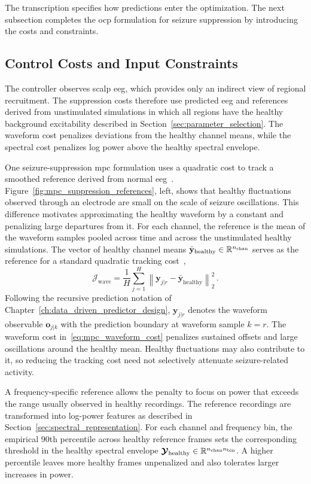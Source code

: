 The transcription specifies how predictions enter the optimization.
The next subsection completes the \ac{ocp} formulation for seizure suppression by introducing the costs and constraints.

\subsection{Control Costs and Input Constraints}\label{sec:mpc_cost_functions}

The controller observes scalp \ac{eeg}, which provides only an indirect view of regional recruitment.
The suppression costs therefore use predicted \ac{eeg} and references derived from unstimulated simulations in which all regions have the healthy background excitability described in Section~\ref{sec:parameter_selection}.
The waveform cost penalizes deviations from the healthy channel means, while the spectral cost penalizes log power above the healthy spectral envelope.

One seizure-suppression \ac{mpc} formulation uses a quadratic cost to track a smoothed reference derived from normal \ac{eeg}~\cite{Chang2020}.
Figure~\ref{fig:mpc_suppression_references}, left, shows that healthy fluctuations observed through an electrode are small on the scale of seizure oscillations.
This difference motivates approximating the healthy waveform by a constant and penalizing large departures from it.
For each channel, the reference is the mean of the waveform samples pooled across time and across the unstimulated healthy simulations.
The vector of healthy channel means $\bar{\mathbf y}_{\mathrm{healthy}}\in\mathbb R^{n_{\mathrm{chan}}}$ serves as the reference for a standard quadratic tracking cost~\cite{Rawlings2017},
%
\begin{equation}
    \mathcal J_{\mathrm{wave}}
    =\frac{1}{H}\sum_{j=1}^{H}
      \left\|\mathbf y_{j|r}-\bar{\mathbf y}_{\mathrm{healthy}}\right\|_2^2\,.
    \label{eq:mpc_waveform_cost}
\end{equation}
%
Following the recursive prediction notation of Chapter~\ref{ch:data_driven_predictor_design}, $\mathbf y_{j|r}$ denotes the waveform observable $\mathbf o_{j|k}$ with the prediction boundary at waveform sample $k=r$.
The waveform cost in~\eqref{eq:mpc_waveform_cost} penalizes sustained offsets and large oscillations around the healthy mean.
Healthy fluctuations may also contribute to it, so reducing the tracking cost need not selectively attenuate seizure-related activity.

A frequency-specific reference allows the penalty to focus on power that exceeds the range usually observed in healthy recordings.
The reference recordings are transformed into log-power features as described in Section~\ref{sec:spectral_representation}.
For each channel and frequency bin, the empirical 90th percentile across healthy reference frames sets the corresponding threshold in the healthy spectral envelope $\boldsymbol{\mathcal{Y}}_{\mathrm{healthy}}\in\mathbb R^{n_{\mathrm{chan}}n_{\mathrm{bin}}}$.
A higher percentile leaves more healthy frames unpenalized and also tolerates larger increases in power.

